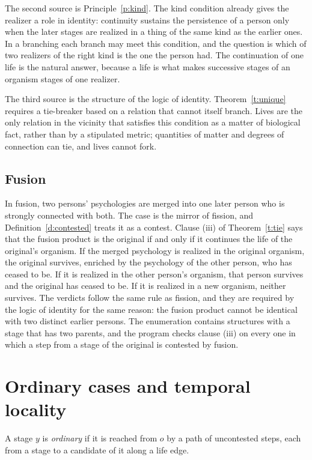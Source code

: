 \documentclass{situationist-preprint}
\begin{document}
The second source is Principle~\ref{p:kind}. The kind condition already gives the realizer a role in identity: continuity sustains the persistence of a person only when the later stages are realized in a thing of the same kind as the earlier ones. In a branching each branch may meet this condition, and the question is which of two realizers of the right kind is the one the person had. The continuation of one life is the natural answer, because a life is what makes successive stages of an organism stages of one realizer.

The third source is the structure of the logic of identity. Theorem~\ref{t:unique} requires a tie-breaker based on a relation that cannot itself branch. Lives are the only relation in the vicinity that satisfies this condition as a matter of biological fact, rather than by a stipulated metric; quantities of matter and degrees of connection can tie, and lives cannot fork.

\subsection{Fusion}

In fusion, two persons' psychologies are merged into one later person who is strongly connected with both. The case is the mirror of fission, and Definition~\ref{d:contested} treats it as a contest. Clause (iii) of Theorem~\ref{t:tie} says that the fusion product is the original if and only if it continues the life of the original's organism. If the merged psychology is realized in the original organism, the original survives, enriched by the psychology of the other person, who has ceased to be. If it is realized in the other person's organism, that person survives and the original has ceased to be. If it is realized in a new organism, neither survives. The verdicts follow the same rule as fission, and they are required by the logic of identity for the same reason: the fusion product cannot be identical with two distinct earlier persons. The enumeration contains \stfusionstruct{} structures with a stage that has two parents, and the program checks clause (iii) on every one in which a step from a stage of the original is contested by fusion.

\section{Ordinary cases and temporal locality}\label{s:ordinary}

\begin{definition}\label{d:ordinary}
A stage $y$ is \emph{ordinary} if it is reached from $o$ by a path of uncontested steps, each from a stage to a candidate of it along a life edge.
\end{definition}
\end{document}
